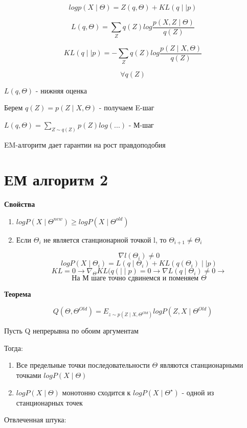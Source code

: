 \documentclass[a4paper, 12pt]{article}
\begin{document}
\[log p(X \mid \Theta) = Z(q, \Theta) + KL(q \mid \mid p)\]

\[L(q, \Theta) = \sum_{Z} q(Z)log \frac{p(X, Z \mid \Theta)}{q(Z)}\]

\[KL(q \mid \mid p) = -\sum_{Z} q(Z)log \frac{p(Z \mid X, \Theta)}{q(Z)}\]

\[\forall q(Z)\]

\(L(q, \Theta)\) - нижняя оценка

Берем \(q(Z) = p(Z \mid X, \Theta)\) - получаем E-шаг

\(L(q, \Theta) = \sum_{Z \sim q(Z)} p(Z) log(...)\) - М-шаг

EM-алгоритм дает гарантии на рост правдоподобия

\section{ЕМ алгоритм 2}

\textbf{Свойства}

\begin{enumerate}
    \item \(logP(X \mid \Theta^{new}) \geq logP(X \mid \Theta^{old})\)
    \item Если $\Theta_{i}$ не является станционарной точкой l, 
    то $\Theta_{i + 1} \neq \Theta_{i}$

    \[\nabla l(\Theta_i) \neq 0\]
    \[logP(X \mid \Theta_i) = L(q \mid \Theta_i) + 
    KL(q(\Theta_i) \mid\mid p)\]
    \[KL = 0 \rightarrow 
    \nabla_{\Theta}KL(q( \mid \mid p) = 0 \rightarrow 
    \nabla L(q \mid \Theta_i) \neq 0 \rightarrow\]
    \[\textrm{На М шаге точно сдвинемся и поменяем }\Theta\]
\end{enumerate}

\textbf{Теорема}

\[Q(\Theta, \Theta^{Old}) = 
E_{z \sim p(Z \mid X, \Theta^{Old})}
logP(Z, X \mid \Theta^{Old})\]

Пусть Q непрерывна по обоим аргументам

Тогда:

\begin{enumerate}
    \item Все предельные точки последовательности $\Theta$
    являются станционарными точками $logP(X \mid \Theta)$
    \item $logP(X \mid \Theta)$ монотонно сходится к 
    $logP(X \mid \Theta^{\star})$ - одной из станционарных точек 
\end{enumerate}

Отвлеченная штука:
\end{document}
